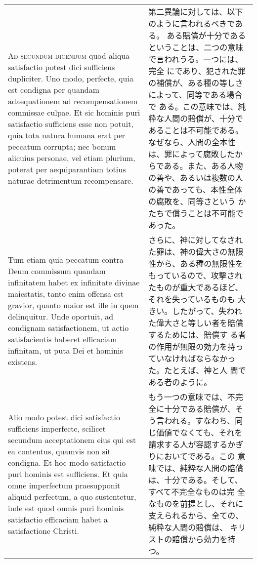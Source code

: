 \documentclass[10pt]{jsarticle} %
\begin{document}
\begin{longtable}{p{21em}p{21em}}
{\scshape Ad secundum dicendum} quod aliqua satisfactio potest dici
 sufficiens dupliciter. Uno modo, perfecte, quia est condigna per
 quandam adaequationem ad recompensationem commissae culpae. Et sic
 hominis puri satisfactio sufficiens esse non potuit, quia tota natura
 humana erat per peccatum corrupta; nec bonum alicuius personae, vel
 etiam plurium, poterat per aequiparantiam totius naturae detrimentum
 recompensare. 


&

第二異論に対しては、以下のように言われるべきである。
ある賠償が十分であるということは、二つの意味で言われうる。一つには、完全
 にであり、犯された罪の補償が、ある種の等しさによって、同等である場合で
 ある。この意味では、純粋な人間の賠償が、十分であることは不可能である。
 なぜなら、人間の全本性は、罪によって腐敗したからである。また、ある人物
 の善や、あるいは複数の人の善であっても、本性全体の腐敗を、同等さという
 かたちで償うことは不可能であった。



\\

Tum etiam quia peccatum contra Deum commissum quandam
 infinitatem habet ex infinitate divinae maiestatis, tanto enim offensa
 est gravior, quanto maior est ille in quem delinquitur. Unde oportuit,
 ad condignam satisfactionem, ut actio satisfacientis haberet efficaciam
 infinitam, ut puta Dei et hominis existens. 



&

さらに、神に対してなされた罪は、神の偉大さの無限性から、ある種の無限性を
 もっているので、攻撃されたものが重大であるほど、それを失っているものも
 大きい。したがって、失われた偉大さと等しい者を賠償するためには、賠償す
 る者の作用が無限の効力を持っていなければならなかった。たとえば、神と人
 間である者のように。


\\

Alio modo potest dici
 satisfactio sufficiens imperfecte, scilicet secundum acceptationem eius
 qui est ea contentus, quamvis non sit condigna. Et hoc modo satisfactio
 puri hominis est sufficiens. Et quia omne imperfectum praesupponit
 aliquid perfectum, a quo sustentetur, inde est quod omnis puri hominis
 satisfactio efficaciam habet a satisfactione Christi.

&

もう一つの意味では、不完全に十分である賠償が、そう言われる。すなわち、同
 じ価値でなくても、それを請求する人が容認するかぎりにおいてである。この
 意味では、純粋な人間の賠償は、十分である。そして、すべて不完全なものは完
 全なものを前提とし、それに支えられるから、全ての、純粋な人間の賠償は、
 キリストの賠償から効力を持つ。



\end{longtable}
\end{document}
